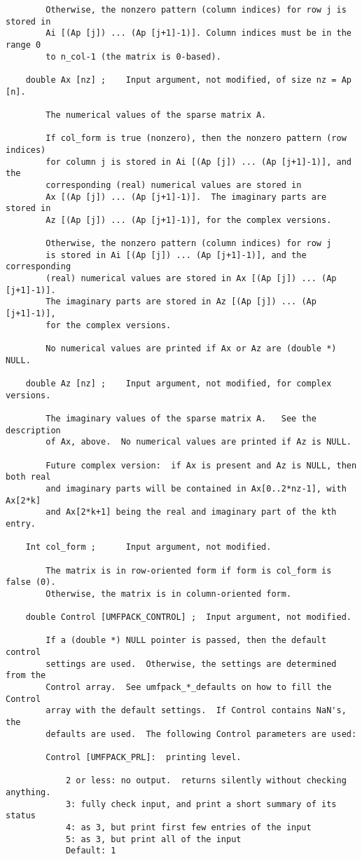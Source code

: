 {\begin{verbatim}
        Otherwise, the nonzero pattern (column indices) for row j is stored in
        Ai [(Ap [j]) ... (Ap [j+1]-1)]. Column indices must be in the range 0
        to n_col-1 (the matrix is 0-based).

    double Ax [nz] ;    Input argument, not modified, of size nz = Ap [n].

        The numerical values of the sparse matrix A.

        If col_form is true (nonzero), then the nonzero pattern (row indices)
        for column j is stored in Ai [(Ap [j]) ... (Ap [j+1]-1)], and the
        corresponding (real) numerical values are stored in
        Ax [(Ap [j]) ... (Ap [j+1]-1)].  The imaginary parts are stored in
        Az [(Ap [j]) ... (Ap [j+1]-1)], for the complex versions.

        Otherwise, the nonzero pattern (column indices) for row j
        is stored in Ai [(Ap [j]) ... (Ap [j+1]-1)], and the corresponding
        (real) numerical values are stored in Ax [(Ap [j]) ... (Ap [j+1]-1)].
        The imaginary parts are stored in Az [(Ap [j]) ... (Ap [j+1]-1)],
        for the complex versions.

        No numerical values are printed if Ax or Az are (double *) NULL.

    double Az [nz] ;    Input argument, not modified, for complex versions.

        The imaginary values of the sparse matrix A.   See the description
        of Ax, above.  No numerical values are printed if Az is NULL. 

        Future complex version:  if Ax is present and Az is NULL, then both real
        and imaginary parts will be contained in Ax[0..2*nz-1], with Ax[2*k]
        and Ax[2*k+1] being the real and imaginary part of the kth entry.

    Int col_form ;      Input argument, not modified.

        The matrix is in row-oriented form if form is col_form is false (0).
        Otherwise, the matrix is in column-oriented form.

    double Control [UMFPACK_CONTROL] ;  Input argument, not modified.

        If a (double *) NULL pointer is passed, then the default control
        settings are used.  Otherwise, the settings are determined from the
        Control array.  See umfpack_*_defaults on how to fill the Control
        array with the default settings.  If Control contains NaN's, the
        defaults are used.  The following Control parameters are used:

        Control [UMFPACK_PRL]:  printing level.

            2 or less: no output.  returns silently without checking anything.
            3: fully check input, and print a short summary of its status
            4: as 3, but print first few entries of the input
            5: as 3, but print all of the input
            Default: 1
\end{verbatim}
}

